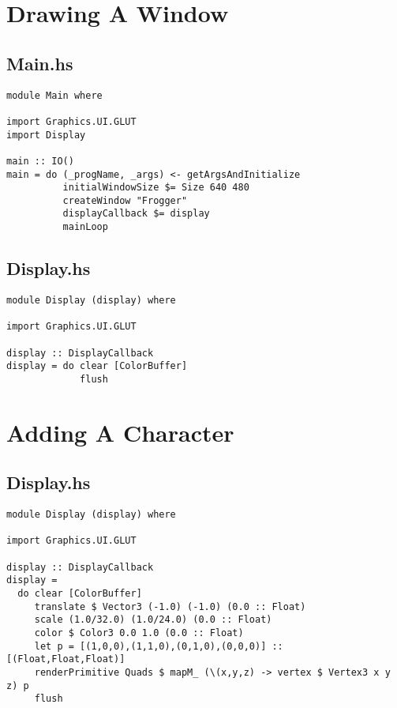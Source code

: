 \documentclass[12pt, a4paper]{report}
\begin{document}
\pagebreak
%
%
\appendix

\section{Drawing A Window}
\subsection{Main.hs}
\begin{lstlisting}
module Main where

import Graphics.UI.GLUT
import Display

main :: IO()
main = do (_progName, _args) <- getArgsAndInitialize
          initialWindowSize $= Size 640 480
          createWindow "Frogger"
          displayCallback $= display
          mainLoop
\end{lstlisting}

\subsection{Display.hs}
\begin{lstlisting}
module Display (display) where

import Graphics.UI.GLUT

display :: DisplayCallback
display = do clear [ColorBuffer]
             flush
\end{lstlisting}

\section{Adding A Character}
\subsection{Display.hs}
\begin{lstlisting}
module Display (display) where

import Graphics.UI.GLUT

display :: DisplayCallback
display =
  do clear [ColorBuffer]
     translate $ Vector3 (-1.0) (-1.0) (0.0 :: Float)
     scale (1.0/32.0) (1.0/24.0) (0.0 :: Float)
     color $ Color3 0.0 1.0 (0.0 :: Float)
     let p = [(1,0,0),(1,1,0),(0,1,0),(0,0,0)] :: [(Float,Float,Float)]
     renderPrimitive Quads $ mapM_ (\(x,y,z) -> vertex $ Vertex3 x y z) p
     flush
\end{lstlisting}
\end{document}

